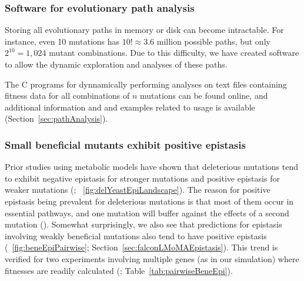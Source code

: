 \subsubsection{Software for evolutionary path analysis}

Storing all evolutionary paths in memory or disk can become 
intractable. For instance, even 10 mutations has $10! \approx
3.6$ million possible paths, but only $2^{10} = 1,024$ mutant
combinations. Due to this difficulty, we have created software to allow 
the dynamic exploration and analyses of these paths. 

The C programs for dynnamically performing analyses on text files
containing fitness data for all combinations of $n$ mutations can be
found online, and additional information and and examples related to
usage is available (\suppOrApp Section~\ref{sec:pathAnalysis}).

\subsubsection{Small beneficial mutants exhibit positive epistasis}

Prior studies using metabolic models have shown that deleterious
mutations tend to exhibit negative epistasis for stronger mutations
and positive epistasis for weaker mutations (\citep{He2010, Xu2012};
\suppOrApp \Fig~\ref{fig:delYeastEpiLandscape}). The reason for positive epistasis
being prevalent for deleterious mutations is that most of them occur
in essential pathways, and one mutation will buffer against the
effects of a second mutation (\citep{Xu2012}). Somewhat surprisingly,
we also see that predictions for epistasis involving weakly beneficial
mutations also tend to have positive epistasis
(\Fig~\ref{fig:beneEpiPairwise}; Section~\ref{sec:falconLMoMAEpistasis}). 
This trend is verified for two experiments involving
multiple genes (as in our simulation) where fitnesses are readily
calculated (\citep{Chou2011, Khan2011}; Table~\ref{tab:pairwiseBeneEpi}).

